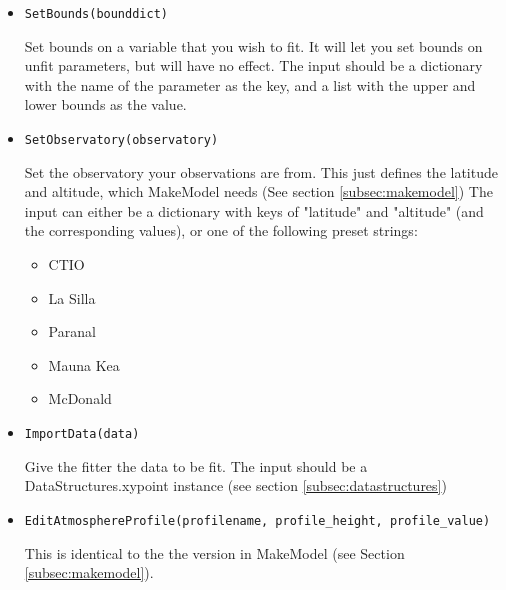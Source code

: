 \documentclass{article}
\begin{document}
\begin{itemize}
  \item \begin{Verbatim}[commandchars=\\\{\}]
SetBounds(bounddict)
    \end{Verbatim}
    Set bounds on a variable that you wish to fit. It will let you set bounds on unfit parameters, but will have no effect. The input should be a dictionary with the name of the parameter as the key, and a list with the upper and lower bounds as the value.
    
  \item \begin{Verbatim}[commandchars=\\\{\}]
SetObservatory(observatory)
    \end{Verbatim}
    Set the observatory your observations are from. This just defines the latitude and altitude, which MakeModel needs (See section \ref{subsec:makemodel})
    The input can either be a dictionary with keys of "latitude" and "altitude" (and the corresponding values), or one of the following preset strings:
    \begin{itemize}
      \item CTIO
      \item La Silla
      \item Paranal
      \item Mauna Kea
      \item McDonald
    \end{itemize}
    
  \item \begin{Verbatim}[commandchars=\\\{\}]
ImportData(data)
    \end{Verbatim}
    Give the fitter the data to be fit. The input should be a DataStructures.xypoint instance (see section \ref{subsec:datastructures})
  
  \item \begin{Verbatim}[commandchars=\\\{\}]
EditAtmosphereProfile(profilename, profile_height, profile_value)
    \end{Verbatim}
    This is identical to the the version in MakeModel (see Section \ref{subsec:makemodel}).
    

\end{itemize}
\end{document}
